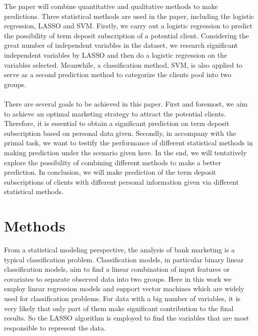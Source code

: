 \documentclass{article} %
\begin{document}
The paper will combine quantitative and qualitative methods to make predictions. 
Three statistical methods are used in the paper, including the logistic regression, LASSO and SVM. Firstly, we carry out a logistic regression to predict the possibility of term deposit subscription of a potential client. Considering the great number of independent variables in the dataset, we research significant independent variables by LASSO and then do a logistic regression on the variables selected. Meanwhile, a classification method, SVM, is also applied to serve as a second prediction method to categorize the clients pool into two groups.  \\\\
There are several goals to be achieved in this paper. First and foremost, we aim to achieve an optimal marketing strategy to attract the potential clients. Therefore, it is essential to obtain a significant prediction on term deposit subscription based on personal data given. Secondly, in accompany with the primal task, we want to testify the performance of different statistical methods in making prediction under the scenario given here. In the end, we will tentatively explore the possibility of combining different methods to make a better prediction. In conclusion, we will make prediction of the term deposit subscriptions of clients with different personal information given via different statistical methods.

\section{Methods}
From a statistical modeling perspective, the analysis of bank marketing is a typical classification problem. Classification models, in particular binary linear classification models, aim to find a linear combination of input features or covariates to separate observed data into two groups. Here in this work we employ linear regression models and support vector machines which are widely used for classification problems. For data with a big number of variables, it is very likely that only part of them make significant contribution to the final results. So the LASSO algorithm is employed to find the variables that are most responsible to represent the data. 
\end{document}
